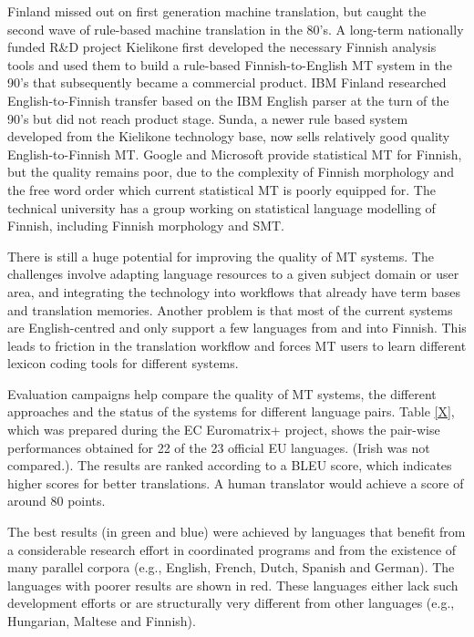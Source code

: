 \documentclass[]{../../metanetpaper}
\begin{document}
\begin{Parallel}[c]{70mm}{70mm}
{Finland missed out on first generation machine translation, but caught the
second wave of rule-based machine translation in the 80’s. A long-term
nationally funded R\&D project Kielikone first developed the necessary Finnish
analysis tools and used them to build a rule-based Finnish-to-English MT system
in the 90’s that subsequently became a commercial product. IBM Finland
researched English-to-Finnish transfer based on the IBM English parser at the
turn of the 90’s but did not reach product stage. Sunda, a newer rule based
system developed from the Kielikone technology base, now sells relatively good
quality English-to-Finnish MT. Google and Microsoft provide statistical MT for
Finnish, but the quality remains poor, due to the complexity of Finnish
morphology and the free word order which current statistical MT is poorly
equipped for. The technical university has a group working on statistical
language modelling of Finnish, including Finnish morphology and SMT.

There is still a huge potential for improving the quality of MT
systems. The challenges involve adapting language resources to a given
subject domain or user area, and integrating the technology into
workflows that already have term bases and translation
memories. Another problem is that most of the current systems are
English-centred and only support a few languages from and into
Finnish. This leads to friction in the translation workflow and forces
MT users to learn different lexicon coding tools for different
systems.

Evaluation campaigns help compare the quality of MT systems, the
different approaches and the status of the systems for different
language pairs. Table \ref{X}, which was prepared during the EC
Euromatrix+ project, shows the pair-wise performances obtained for 22
of the 23 official EU languages. (Irish was not compared.). The
results are ranked according to a BLEU score, which indicates higher
scores for better translations\cite{BLEU}. A human translator would
achieve a score of around 80 points.

The best results (in green and blue) were achieved by languages that
benefit from a considerable research effort in coordinated programs
and from the existence of many parallel corpora (e.g., English,
French, Dutch, Spanish and German). The languages with poorer results
are shown in red. These languages either lack such development efforts
or are structurally very different from other languages (e.g.,
Hungarian, Maltese and Finnish).

}
\end{Parallel}
\end{document}
